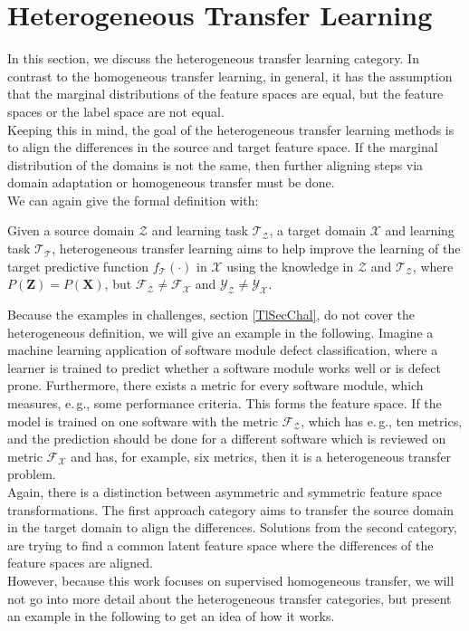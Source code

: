 \section{Heterogeneous Transfer Learning}\label{TlSecHetero}
In this section, we discuss the heterogeneous transfer learning category.
In contrast to the homogeneous transfer learning, in general, it has the assumption that the marginal distributions of the feature spaces are equal, but the feature spaces or the label space are not equal.\cite[p. 4]{Weiss.2016}\\
Keeping this in mind, the goal of the heterogeneous transfer learning methods is to align the differences in the source and target feature space.
If the marginal distribution of the domains is not the same, then further aligning steps via domain adaptation or homogeneous transfer must be done.
\cite[p. 6]{Weiss.2016}\\
We can again give the formal definition with:
\begin{mDef}
	Given a source domain $\mathcal{Z}$ and learning task $\mathcal{T_Z}$, a target domain $\mathcal{X}$ and learning task $\mathcal{T_T}$, heterogeneous transfer learning aims to help improve the learning of the target predictive function $f_\mathcal{T}(\cdot)$ in $\mathcal{X}$ using the knowledge in $\mathcal{Z}$ and $\mathcal{T_Z}$, where $P(\mathbf{Z}) = P(\mathbf{X})$, but $\mathcal{F_Z} \neq \mathcal{F_X}$ and $\mathcal{Y_Z} \neq \mathcal{Y_X} $.\cite[p. 4]{Weiss.2016}
\end{mDef}
Because the examples in challenges, section \ref{TlSecChal}, do not cover the heterogeneous definition, we will give an example in the following.
Imagine a machine learning application of software module defect classification, where a learner is trained to predict whether a software module works well or is defect prone.
Furthermore, there exists a metric for every software module, which measures, e.\,g., some performance criteria.
This forms the feature space.
If the model is trained on one software with the metric $\mathcal{F_Z}$, which has e.\,g., ten metrics, and the prediction should be done for a different software which is reviewed on metric $\mathcal{F_X}$ and has, for example, six metrics, then it is a heterogeneous transfer problem.\cite[p 3-4]{Weiss.2016}\\
Again, there is a distinction between asymmetric and symmetric feature space transformations.
The first approach category aims to transfer the source domain in the target domain to align the differences.
Solutions from the second category, are trying to find a common latent feature space where the differences of the feature spaces are aligned.\cite[p. 19]{Weiss.2016}\\
However, because this work focuses on supervised homogeneous transfer, we will not go into more detail about the heterogeneous transfer categories, but present an example in the following to get an idea of how it works.\\

